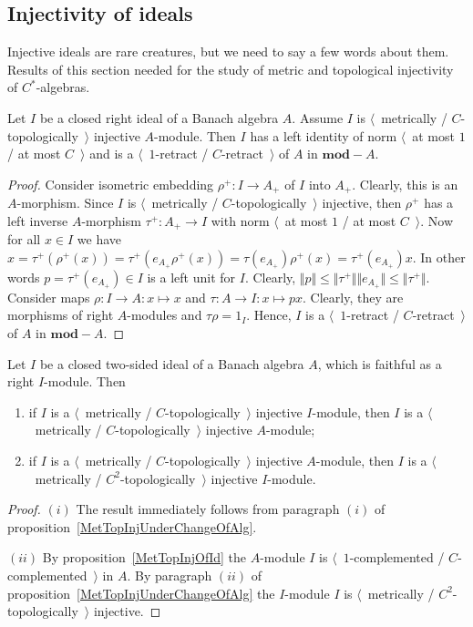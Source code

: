 \subsection{
    Injectivity of ideals}\label{SubSectionInjectivityOfIdeals}

Injective ideals are rare creatures, but we need to say a few words about them.
Results of this section needed for the study of metric and topological
injectivity of $C^*$-algebras.

\begin{proposition}\label{MetTopInjOfId} Let $I$ be a closed right ideal of a Banach
algebra $A$. Assume $I$ is $\langle$~metrically / $C$-topologically~$\rangle$
injective $A$-module. Then $I$ has a left identity of norm $\langle$~at most $1$
/ at most $C$~$\rangle$ and is a $\langle$~$1$-retract / $C$-retract~$\rangle$
of $A$ in $\mathbf{mod}-A$.
\end{proposition}
\begin{proof} Consider isometric embedding $\rho^+:I\to A_+$ of $I$ into $A_+$.
Clearly, this is an $A$-morphism. Since $I$ is $\langle$~metrically /
$C$-topologically~$\rangle$ injective, then $\rho^+$ has a left inverse
$A$-morphism $\tau^+:A_+\to I$ with norm $\langle$~at most $1$ / at most
$C$~$\rangle$. Now for all $x\in I$ we have
$x
=\tau^+(\rho^+(x))
=\tau^+(e_{A_+}\rho^+(x))
=\tau(e_{A_+})\rho^+(x)=\tau^+(e_{A_+})x$.
In other words $p=\tau^+(e_{A_+})\in I$ is a left unit for $I$. Clearly, 
$\Vert p\Vert
\leq\Vert\tau^+\Vert\Vert e_{A_+}\Vert
\leq\Vert\tau^+\Vert$. Consider maps
$\rho:I\to A:x\mapsto x$ and $\tau:A\to I:x\mapsto p x$. Clearly, they are
morphisms of right $A$-modules and $\tau\rho=1_I$. Hence, $I$ is a
$\langle$~$1$-retract / $C$-retract~$\rangle$ of $A$ in $\mathbf{mod}-A$.
\end{proof}

\begin{proposition}\label{ReduceInjIdToInjAlg} Let $I$ be a closed two-sided ideal of
a Banach algebra $A$, which is faithful as a right $I$-module. Then

\begin{enumerate}[label = (\roman*)]
    \item if $I$ is a $\langle$~metrically / $C$-topologically~$\rangle$ injective
    $I$-module, then $I$ is a $\langle$~metrically / $C$-topologically~$\rangle$
    injective $A$-module; 

    \item if $I$ is a $\langle$~metrically / $C$-topologically~$\rangle$ injective
    $A$-module, then $I$ is a $\langle$~metrically / $C^2$-topologically~$\rangle$
    injective $I$-module.
\end{enumerate}
\end{proposition}
\begin{proof} $(i)$ The result immediately follows from paragraph $(i)$ of
proposition~\ref{MetTopInjUnderChangeOfAlg}.

$(ii)$ By proposition~\ref{MetTopInjOfId} the $A$-module $I$ is
$\langle$~$1$-complemented / $C$-complemented~$\rangle$ in $A$. By paragraph
$(ii)$ of proposition~\ref{MetTopInjUnderChangeOfAlg} the $I$-module $I$ is
$\langle$~metrically / $C^2$-topologically~$\rangle$ injective.
\end{proof}

